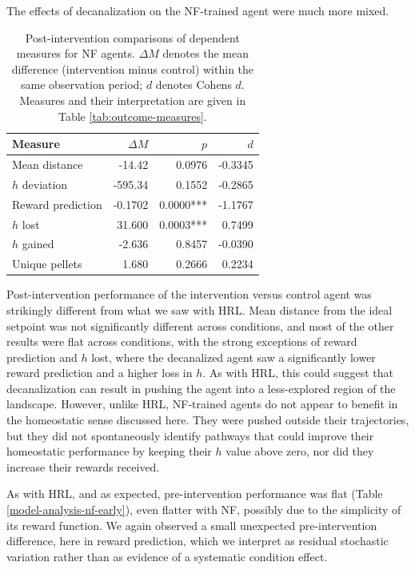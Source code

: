 \documentclass[12pt,fleqn]{article}
\begin{document}
The effects of decanalization on the NF-trained agent were much more mixed.
\begin{table}[htbp]
  \centering
  \small
  \begin{tabular}{@{}lrrr@{}}
    \toprule
    \textbf{Measure} & \textbf{\(\Delta M\)} & \textbf{\(p\)} & \textbf{\(d\)} \\
    \midrule
    Mean distance & -14.42 & 0.0976 & -0.3345 \\
    \(h\) deviation & -595.34 & 0.1552 & -0.2865 \\
    Reward prediction & -0.1702 & 0.0000*** & -1.1767 \\
    \(h\) lost & 31.600 & 0.0003*** & 0.7499 \\
    \(h\) gained & -2.636 & 0.8457 & -0.0390 \\
    Unique pellets & 1.680 & 0.2666 & 0.2234 \\
    \bottomrule
  \end{tabular}
  \caption{Post-intervention comparisons of dependent measures for NF agents. \(\Delta M\) denotes the mean difference (intervention minus control) within the same observation period; \(d\) denotes Cohen\textquotesingle s \(d\). Measures and their interpretation are given in Table \ref{tab:outcome-measures}.}
  \label{model-analysis-nf}
\end{table}

Post-intervention performance of the intervention versus control agent was strikingly different from what we saw with HRL. Mean distance from the ideal setpoint was not significantly different across conditions, and most of the other results were flat across conditions, with the strong exceptions of reward prediction and \(h\) lost, where the decanalized agent saw a significantly lower reward prediction and a higher loss in \(h\). As with HRL, this could suggest that decanalization can result in pushing the agent into a less-explored region of the landscape. However, unlike HRL, NF-trained agents do not appear to benefit in the homeostatic sense discussed here. They were pushed outside their trajectories, but they did not spontaneously identify pathways that could improve their homeostatic performance by keeping their \(h\) value above zero, nor did they increase their rewards received.

As with HRL, and as expected, pre-intervention performance was flat (Table \ref{model-analysis-nf-early}), even flatter with NF, possibly due to the simplicity of its reward function. We again observed a small unexpected pre-intervention difference, here in reward prediction, which we interpret as residual stochastic variation rather than as evidence of a systematic condition effect.
\end{document}
